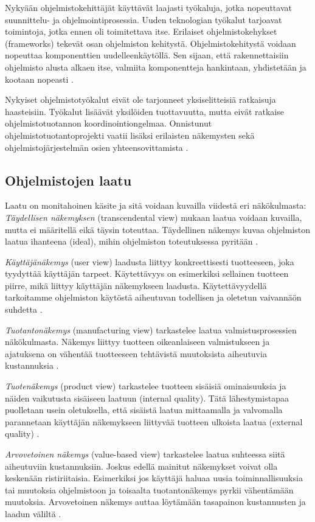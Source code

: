 \documentclass[finnish]{tktltiki2}
\theoremstyle{definition}
\theoremstyle{remark}
\begin{document}
Nykyään ohjelmistokehittäjät käyttävät laajasti työkaluja, jotka nopeuttavat suunnittelu- ja ohjelmointiprosessia. Uuden teknologian työkalut tarjoavat toimintoja, jotka ennen oli toimitettava itse. Erilaiset ohjelmistokehykset (frameworks) tekevät osan ohjelmiston kehitystä. Ohjelmistokehitystä voidaan nopeuttaa komponenttien uudelleenkäytöllä. Sen sijaan, että rakennettaisiin ohjelmisto alusta alkaen itse, valmiita komponentteja hankintaan, yhdistetään ja kootaan nopeasti \cite{BRL03}.

Nykyiset ohjelmistotyökalut eivät ole tarjonneet yksiselitteisiä ratkaisuja haasteisiin. Työkalut lisäävät yksilöiden tuottavuutta, mutta eivät ratkaise ohjelmistotuotannon koordinointiongelmaa. Onnistunut ohjelmistotuotantoprojekti vaatii lisäksi erilaisten näkemysten sekä ohjelmistojärjestelmän osien yhteensovittamista \cite{KES95}.

\subsection{Ohjelmistojen laatu}

Laatu on monitahoinen käsite ja sitä voidaan kuvailla viidestä eri näkökulmasta: \textit{Täydellisen näkemyksen} (transcendental view) mukaan laatua voidaan kuvailla, mutta ei määritellä eikä täysin toteuttaa. Täydellinen näkemys kuvaa ohjelmiston laatua ihanteena (ideal), mihin ohjelmiston toteutuksessa pyritään \cite{KIP96}. 

\textit{ Käyttäjänäkemys} (user view) laadusta liittyy konkreettisesti tuotteeseen, joka tyydyttää käyttäjän tarpeet. Käytettävyys on esimerkiksi sellainen tuotteen piirre, mikä liittyy käyttäjän näkemykseen laadusta. Käytettävyydellä tarkoitamme ohjelmiston käytöstä aiheutuvan todellisen ja oletetun vaivannäön suhdetta \cite{KIP96}.  

\textit{Tuotantonäkemys} (manufacturing view) tarkastelee laatua valmistusprosessien näkökulmasta. Näkemys liittyy tuotteen oikeanlaiseen valmistukseen ja ajatuksena on vähentää tuotteeseen tehtävistä muutoksista aiheutuvia kustannuksia \cite{KIP96}. 

 \textit {Tuotenäkemys} (product view) tarkastelee tuotteen sisäisiä ominaisuuksia ja näiden vaikutusta sisäiseen laatuun (internal quality). Tätä lähestymistapaa puolletaan usein oletuksella, että sisäistä laatua mittaamalla ja valvomalla parannetaan käyttäjän näkemykseen liittyvää tuotteen ulkoista laatua (external quality) \cite{KIP96}.  

 \textit{Arvovetoinen näkemys} (value-based view) tarkastelee laatua suhteessa siitä aiheutuviin kustannuksiin. Joskus edellä mainitut näkemykset voivat olla keskenään ristiriitaisia. Esimerkiksi jos käyttäjä haluaa uusia toiminnallisuuksia tai muutoksia ohjelmistoon ja toisaalta tuotantonäkemys pyrkii vähentämään muutoksia. Arvovetoinen näkemys auttaa löytämään tasapainon kustannusten ja laadun väliltä \cite{KIP96}.
\end{document}
